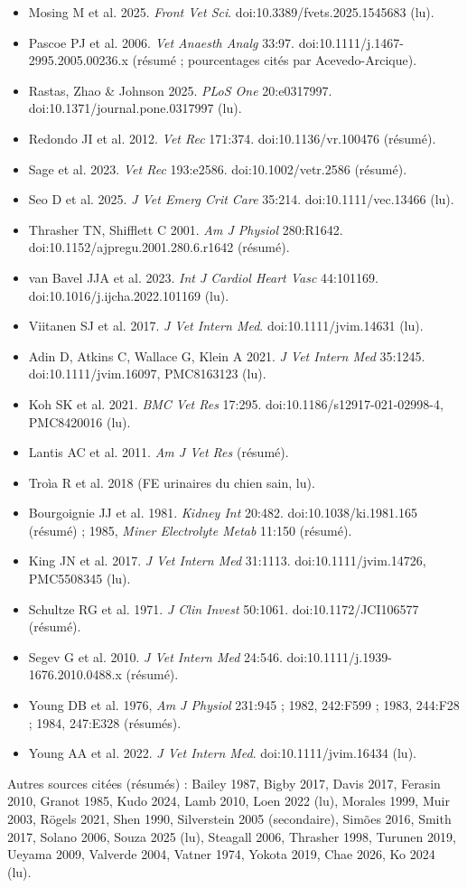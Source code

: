 \documentclass[10pt,a4paper]{article}
\begin{document}
\begin{itemize}
\item Mosing M et al. 2025. \emph{Front Vet Sci}. doi:10.3389/fvets.2025.1545683 (lu).
\item Pascoe PJ et al. 2006. \emph{Vet Anaesth Analg} 33:97. doi:10.1111/j.1467-2995.2005.00236.x (résumé ; pourcentages cités par Acevedo-Arcique).
\item Rastas, Zhao \& Johnson 2025. \emph{PLoS One} 20:e0317997. doi:10.1371/journal.pone.0317997 (lu).
\item Redondo JI et al. 2012. \emph{Vet Rec} 171:374. doi:10.1136/vr.100476 (résumé).
\item Sage et al. 2023. \emph{Vet Rec} 193:e2586. doi:10.1002/vetr.2586 (résumé).
\item Seo D et al. 2025. \emph{J Vet Emerg Crit Care} 35:214. doi:10.1111/vec.13466 (lu).
\item Thrasher TN, Shifflett C 2001. \emph{Am J Physiol} 280:R1642. doi:10.1152/ajpregu.2001.280.6.r1642 (résumé).
\item van Bavel JJA et al. 2023. \emph{Int J Cardiol Heart Vasc} 44:101169. doi:10.1016/j.ijcha.2022.101169 (lu).
\item Viitanen SJ et al. 2017. \emph{J Vet Intern Med}. doi:10.1111/jvim.14631 (lu).
\item Adin D, Atkins C, Wallace G, Klein A 2021. \emph{J Vet Intern Med} 35:1245. doi:10.1111/jvim.16097, PMC8163123 (lu).
\item Koh SK et al. 2021. \emph{BMC Vet Res} 17:295. doi:10.1186/s12917-021-02998-4, PMC8420016 (lu).
\item Lantis AC et al. 2011. \emph{Am J Vet Res} (résumé).
\item Troìa R et al. 2018 (FE urinaires du chien sain, lu).
\item Bourgoignie JJ et al. 1981. \emph{Kidney Int} 20:482. doi:10.1038/ki.1981.165 (résumé) ; 1985, \emph{Miner Electrolyte Metab} 11:150 (résumé).
\item King JN et al. 2017. \emph{J Vet Intern Med} 31:1113. doi:10.1111/jvim.14726, PMC5508345 (lu).
\item Schultze RG et al. 1971. \emph{J Clin Invest} 50:1061. doi:10.1172/JCI106577 (résumé).
\item Segev G et al. 2010. \emph{J Vet Intern Med} 24:546. doi:10.1111/j.1939-1676.2010.0488.x (résumé).
\item Young DB et al. 1976, \emph{Am J Physiol} 231:945 ; 1982, 242:F599 ; 1983, 244:F28 ; 1984, 247:E328 (résumés).
\item Young AA et al. 2022. \emph{J Vet Intern Med}. doi:10.1111/jvim.16434 (lu).
\end{itemize}
Autres sources citées (résumés) : Bailey 1987, Bigby 2017, Davis 2017, Ferasin 2010, Granot 1985, Kudo 2024, Lamb 2010, Loen 2022 (lu), Morales 1999, Muir 2003, Rögels 2021, Shen 1990, Silverstein 2005 (secondaire), Simões 2016, Smith 2017, Solano 2006, Souza 2025 (lu), Steagall 2006, Thrasher 1998, Turunen 2019, Ueyama 2009, Valverde 2004, Vatner 1974, Yokota 2019, Chae 2026, Ko 2024 (lu).
\end{document}
